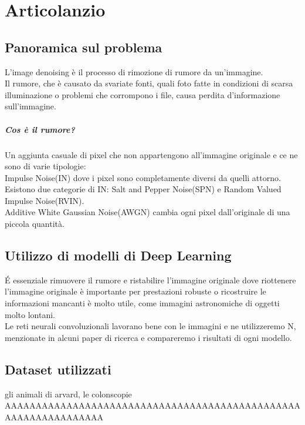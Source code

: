 \documentclass[12pt,a4paper,openright,twoside]{book}
\newcommand{\TODOComment}[1]{}
\begin{document}
\titleformat{\chapter}{\normalfont\huge \bfseries}{\Huge \thechapter}{20pt}{\Huge}
\tableofcontents

\chapter{Articolanzio}
\section{Panoramica sul problema}
L'image denoising è il processo di rimozione di rumore da un'immagine.\\
Il rumore, che è causato da svariate fonti, quali foto fatte in condizioni di scarsa illuminazione o problemi che corrompono i file, causa perdita d'informazione sull'immagine.
\paragraph{Cos è il rumore?} 
Un aggiunta casuale di pixel che non appartengono all'immagine originale e ce ne sono di varie tipologie:\\
Impulse Noise(IN) dove i pixel sono completamente diversi da quelli attorno. Esistono due categorie di IN: Salt and Pepper Noise(SPN) e Random Valued Impulse Noise(RVIN).\\
Additive White Gaussian Noise(AWGN) cambia ogni pixel dall'originale di una piccola quantità.\\

\section{Utilizzo di modelli di Deep Learning}
\'E essenziale rimuovere il rumore e ristabilire l'immagine originale dove 
riottenere l'immagine originale è importante per prestazioni robuste o ricostruire le informazioni mancanti è molto utile, come immagini astronomiche di oggetti molto lontani.\\
Le reti neurali convoluzionali lavorano bene con le immagini e ne utilizzeremo N, menzionate in alcuni paper di ricerca e compareremo i risultati di ogni modello.\\

\section{Dataset utilizzati}
gli animali di arvard, le colonscopie \TODOComment{Approfondire aggiungendo link ai dataset e approfondire cose che non ci sono}
AAAAAAAAAAAAAAAAAAAAAAAAAAAAAAAAAAAAAAAAAAAAAAAAAAAAAAAAAAAAAAAA
\end{document}
